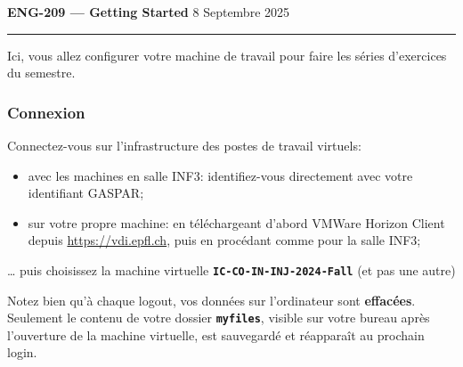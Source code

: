 \documentclass[10pt]{article}
\begin{document}
\setlength{\parskip}{5pt plus 1pt minus 1pt}
\setlength{\parindent}{0pt}
\setlength{\marginparsep}{0.5cm}
\def\thesection{Exercice \arabic{section}.}

\DeclareRobustCommand{\cmdkey}{\raisebox{-.06em}{\texttt{[image: command.pdf]}}}

\newcommand\code[1]{\texttt{\textbf{\small #1}}}
\newcommand\ui[1]{\textsf{#1}}
\newcommand{\marginnote}[1]{\marginpar{\flushleft{{\scriptsize ~\\} \textsf{#1}}}}


{
	\sffamily
	{\Large \bfseries ENG-209 --- Getting Started}
	{\hfill 8 Septembre 2025}
}


\vspace{0.1cm}
\hrule
\vspace{0.3cm}




\newcommand{\bigsubsection}[1]{
	\vspace{0.7cm}
	\textbf{\textit{\large #1}}
}
Ici, vous allez configurer votre machine de travail pour faire les séries d'exercices du semestre.

\subsubsection*{Connexion}

Connectez-vous sur l'infrastructure des postes de travail virtuels:
\begin{itemize}
\itemsep0em
\item avec les machines en salle INF3: identifiez-vous directement avec votre identifiant GASPAR;
\item sur votre propre machine: en téléchargeant d'abord VMWare Horizon Client depuis \url{https://vdi.epfl.ch}, puis en procédant comme pour la salle INF3;
\end{itemize}

… puis choisissez la machine virtuelle \code{IC-CO-IN-INJ-2024-Fall} (et pas une autre)

Notez bien qu'à chaque logout, vos données sur l’ordinateur sont \textbf{effacées}. Seulement le contenu de votre dossier \code{myfiles}, visible sur votre bureau après l'ouverture de la machine virtuelle, est sauvegardé et réapparaît au prochain login.
\end{document}
